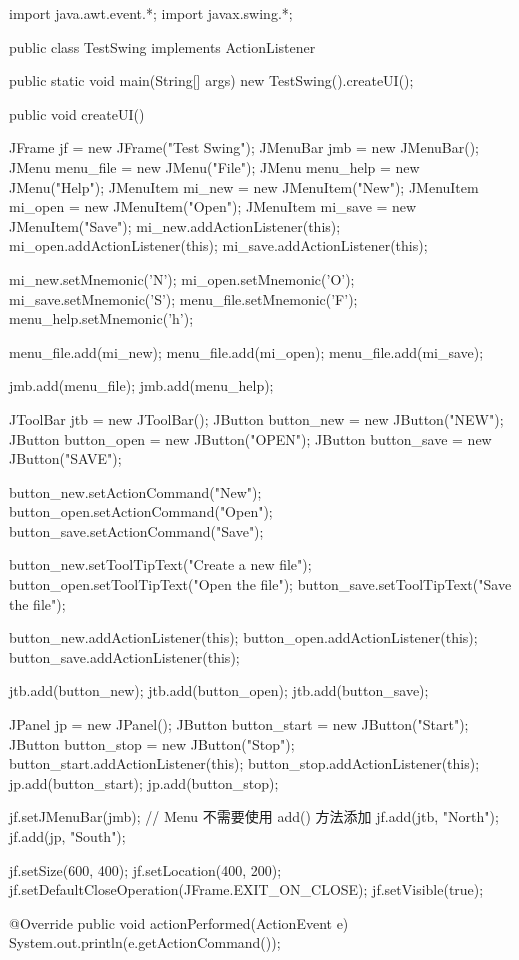 \begin{javaCode}
  import java.awt.event.*;
  import javax.swing.*;

  public class TestSwing implements ActionListener {
    public static void main(String[] args) {
      new TestSwing().createUI();
    }

    public void createUI() {
      JFrame jf = new JFrame("Test Swing");
      JMenuBar jmb = new JMenuBar();
      JMenu menu_file = new JMenu("File");
      JMenu menu_help = new JMenu("Help");
      JMenuItem mi_new = new JMenuItem("New");
      JMenuItem mi_open = new JMenuItem("Open");
      JMenuItem mi_save = new JMenuItem("Save");
      mi_new.addActionListener(this);
      mi_open.addActionListener(this);
      mi_save.addActionListener(this);

      mi_new.setMnemonic('N');
      mi_open.setMnemonic('O');
      mi_save.setMnemonic('S');
      menu_file.setMnemonic('F');
      menu_help.setMnemonic('h');
      
      menu_file.add(mi_new);
      menu_file.add(mi_open);
      menu_file.add(mi_save);
      
      jmb.add(menu_file);
      jmb.add(menu_help);

      JToolBar jtb = new JToolBar();
      JButton button_new = new JButton("NEW");
      JButton button_open = new JButton("OPEN");
      JButton button_save = new JButton("SAVE");

      button_new.setActionCommand("New");
      button_open.setActionCommand("Open");
      button_save.setActionCommand("Save");


      button_new.setToolTipText("Create a new file");
      button_open.setToolTipText("Open the file");
      button_save.setToolTipText("Save the file");
      
      button_new.addActionListener(this);
      button_open.addActionListener(this);
      button_save.addActionListener(this);
      
      jtb.add(button_new);
      jtb.add(button_open);
      jtb.add(button_save);
      
      JPanel jp = new JPanel();
      JButton button_start = new JButton("Start");
      JButton button_stop = new JButton("Stop");
      button_start.addActionListener(this);
      button_stop.addActionListener(this);
      jp.add(button_start);
      jp.add(button_stop);

      jf.setJMenuBar(jmb); // Menu 不需要使用 add() 方法添加
      jf.add(jtb, "North");
      jf.add(jp, "South");
      
      jf.setSize(600, 400);
      jf.setLocation(400, 200);
      jf.setDefaultCloseOperation(JFrame.EXIT_ON_CLOSE);
      jf.setVisible(true);
    }

    @Override
    public void actionPerformed(ActionEvent e) {
      System.out.println(e.getActionCommand());
    }
  }
\end{javaCode}

